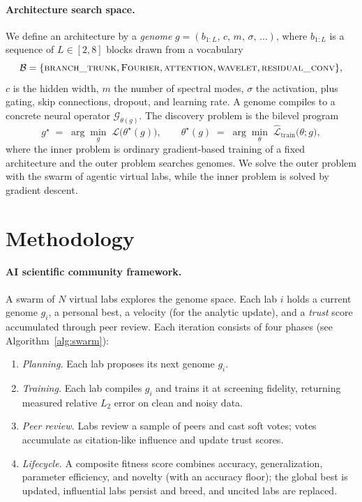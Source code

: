 \documentclass{article}
\begin{document}
\paragraph{Architecture search space.} We define an architecture by a
\emph{genome} $g=(b_{1:L},\,c,\,m,\,\sigma,\,\dots)$, where $b_{1:L}$ is a sequence of $L\in[2,8]$ blocks drawn from a vocabulary
\begin{equation}
\mathcal{B}=\{\textsc{branch\_trunk},\textsc{Fourier},\textsc{attention},\textsc{wavelet},
\textsc{residual\_conv}\},
\end{equation}
$c$ is the hidden width, $m$ the number of spectral modes, $\sigma$ the activation, plus gating, skip connections, dropout, and learning rate. A genome compiles to a concrete neural operator $\mathcal{G}_{\theta(g)}$. The discovery problem is the bilevel program
\begin{equation}
g^\star \;=\; \arg\min_{g}\; \mathcal{L}\big(\theta^\star(g)\big),
\qquad
\theta^\star(g) \;=\; \arg\min_{\theta}\; \widehat{\mathcal{L}}_{\text{train}}\big(\theta; g\big),
\end{equation}
where the inner problem is ordinary gradient-based training of a fixed architecture and the outer problem searches genomes. We solve the outer problem with the swarm of agentic virtual labs, while the inner problem is solved by gradient descent.

\section{Methodology}\label{sec:method}

\paragraph{AI scientific community framework.}\label{sec:framework}
A swarm of $N$ virtual labs explores the genome space. Each lab $i$ holds a current genome $g_i$, a personal best, a velocity (for the analytic update), and a \emph{trust} score accumulated through peer review. Each iteration consists of four phases (see Algorithm~\ref{alg:swarm}):%

\begin{enumerate}[leftmargin=1.5em,itemsep=1pt]
\item \textit{Planning.} Each lab proposes its next genome $g_i$.
\item \textit{Training.} Each lab compiles $g_i$ and trains it at screening
fidelity, returning measured relative $L_2$ error on clean and noisy data.
\item \textit{Peer review.} Labs review a sample of peers and cast soft votes;
votes accumulate as citation-like influence and update trust scores.
\item \textit{Lifecycle.} A composite fitness score combines accuracy, generalization,
parameter efficiency, and novelty (with an accuracy floor); the global best is
updated, influential labs persist and breed, and uncited labs are 
replaced.
\end{enumerate}
\end{document}
